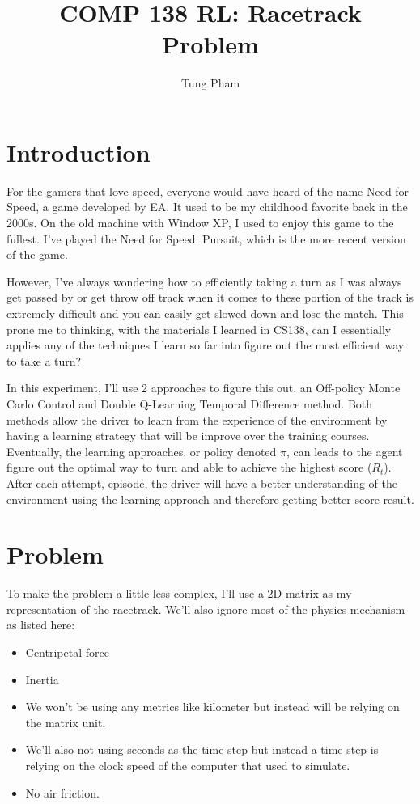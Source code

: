 \documentclass{article}
\title{COMP 138 RL: Racetrack Problem}
\author{Tung Pham}
\begin{document}
\maketitle

\section{Introduction}
For the gamers that love speed, everyone would have heard of the name Need for
Speed, a game developed by EA. It used to be my childhood favorite back in the 2000s. On the old
machine with Window XP, I used to enjoy this game to the fullest. I've played
the Need for Speed: Pursuit, which is the more recent version of the game. 

However, I've
always wondering how to efficiently taking a turn as I was always
get passed by or get throw off track when it comes to these portion of the track
is extremely difficult and you can easily get slowed down and lose the match. This prone me to thinking,
with the materials I learned in CS138, can I essentially applies any of the techniques 
I learn so far into figure out the most efficient way to take a turn?

In this experiment, I'll use 2 approaches to figure this out, an Off-policy
Monte Carlo Control and Double Q-Learning Temporal Difference method. Both
methods allow the driver to learn from the experience of the environment by
having a learning strategy that will be improve over the training courses.
Eventually, the learning approaches, or policy denoted $\pi$, can leads to the agent figure out the
optimal way to turn and able to achieve the highest score ($R_t$). After each attempt,
episode, the driver will have a better understanding of the environment using
the learning approach and therefore getting better score result. 

\section{Problem}
To make the problem a little less complex, I'll use a 2D matrix as my
representation of the racetrack. We'll also ignore most of the physics
mechanism as listed here:
\begin{itemize}
  \item Centripetal force
  \item Inertia
  \item We won't be using any metrics like kilometer but instead will be relying
    on the matrix unit.
  \item We'll also not using seconds as the time step but instead a time step
    is relying on the clock speed of the computer that used to simulate.
  \item No air friction.
\end{itemize}
\end{document}
